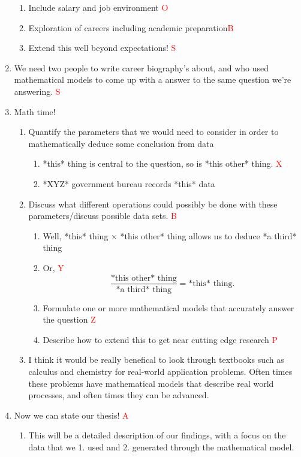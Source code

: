 \begin{enumerate}
\begin{enumerate}
	\item Include salary and job environment \hfill \textcolor{red}{O}
	\item Exploration of careers including academic preparation\hfill \textcolor{red}{B}
	\item Extend this well beyond expectations! \hfill\textcolor{red}{S}
\end{enumerate}
	\item We need two people to write career biography's about, and who used mathematical models to come up with a answer to the same question we're answering. \hfill\textcolor{red}{S}
	\item Math time!
		\begin{enumerate}
			\item Quantify the parameters that we would need to consider in order to mathematically deduce some conclusion from data
		\begin{enumerate}
			\item *this* thing is central to the question, so is *this other* thing. \hfill \textcolor{red}{X}
\item *XYZ* government bureau records *this* data
		\end{enumerate}
	\item Discuss what different operations could possibly be done with these parameters/discuss possible data sets. \hfill\textcolor{red}{B}
		\begin{enumerate}
			\item Well, *this* thing $\times $ *this other* thing allows us to deduce *a third* thing
			\item Or, \hfill\textcolor{red}{Y}\[
			\frac{\text{*this other* thing}}{\text{*a third* thing}}= \text{*this* thing}
				.\] 
		\item Formulate one or more mathematical models that accurately answer the question \hfill\textcolor{red}{Z}
	\item Describe how to extend this to get near cutting edge research \hfill \textcolor{red}{P}
		\end{enumerate}
			\item I think it would be really benefical to look through textbooks such as calculus and chemistry for real-world application problems. 
				Often times these problems have mathematical models that describe real world processes, and often times they can be advanced.
		\end{enumerate}
	\item Now we can state our thesis! \hfill\textcolor{red}{A}
		\begin{enumerate}
			\item This will be a detailed description of our findings, with a focus on the data that we 1. used and 2. generated through the mathematical model.
		\end{enumerate}
	\end{enumerate}
